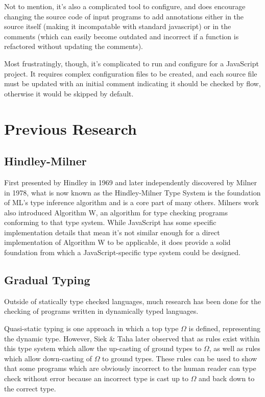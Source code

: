 \documentclass[british, twoside]{bhamthesis}
\theoremstyle{definition}
\begin{document}
    Not to mention, it's also a complicated tool to configure, and does encourage changing the source code of input programs to add annotations either in the source itself (making it incompatable with standard javascript) or in the comments (which can easily become outdated and incorrect if a function is refactored without updating the comments).

    Most frustratingly, though, it's complicated to run and configure for a JavaScript project. It requires complex configuration files to be created, and each source file must be updated with an initial comment indicating it should be checked by flow, otherwise it would be skipped by default.

  \section{Previous Research}

    \subsection{Hindley-Milner}
      First presented by Hindley in 1969 and later independently discovered by Milner in 1978, what is now known as the Hindley-Milner Type System is the foundation of ML's type inference algorithm and is a core part of many others\autocite{Hindley1969}. Milners work also introduced Algorithm W, an algorithm for type checking programs conforming to that type system\autocite{Milner1978}. While JavaScript has some specific implementation details that mean it's not similar enough for a direct implementation of Algorithm W to be applicable, it does provide a solid foundation from which a JavaScript-specific type system could be designed.

    \subsection{Gradual Typing}
      Outside of statically type checked languages, much research has been done for the checking of programs written in dynamically typed languages.

      Quasi-static typing\autocite{Thatte1989} is one approach in which a top type $\Omega$ is defined, representing the dynamic type. However, Siek \& Taha later observed that as rules exist within this type system which allow the up-casting of ground types to $\Omega$, as well as rules which allow down-casting of $\Omega$ to ground types. These rules can be used to show that some programs which are obviously incorrect to the human reader can type check without error because an incorrect type is cast up to $\Omega$ and back down to the correct type\autocite{Siek2006}.
\end{document}
